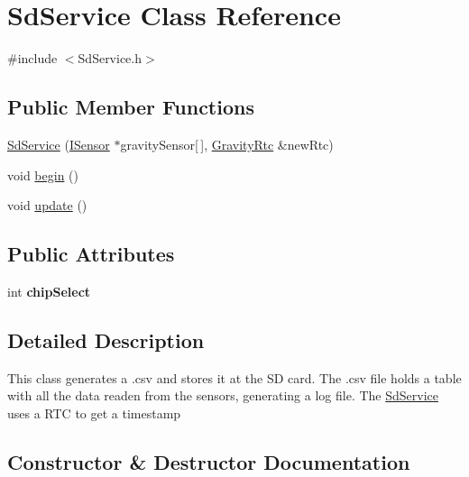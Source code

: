 \hypertarget{class_sd_service}{}\section{Sd\+Service Class Reference}
\label{class_sd_service}


{\ttfamily \#include $<$Sd\+Service.\+h$>$}

\subsection*{Public Member Functions}
\begin{DoxyCompactItemize}
\item 
\hyperlink{class_sd_service_aea88d15b3177b80996d1a6ace96fbff4}{Sd\+Service} (\hyperlink{class_i_sensor}{I\+Sensor} $\ast$gravity\+Sensor\mbox{[}$\,$\mbox{]}, \hyperlink{class_gravity_rtc}{Gravity\+Rtc} \&new\+Rtc)
\item 
void \hyperlink{class_sd_service_a5c6e09a57f22f163676a51eab6f933c5}{begin} ()
\item 
void \hyperlink{class_sd_service_a776b1a8d229b9b0bc44cbf6ae9b37c9d}{update} ()
\end{DoxyCompactItemize}
\subsection*{Public Attributes}
\begin{DoxyCompactItemize}
\item 
int {\bfseries chip\+Select}\hypertarget{class_sd_service_a173f33cc9797e3ce4e213a75e627d2c9}{}\label{class_sd_service_a173f33cc9797e3ce4e213a75e627d2c9}

\end{DoxyCompactItemize}


\subsection{Detailed Description}
This class generates a .csv and stores it at the SD card. The .csv file holds a table with all the data readen from the sensors, generating a log file. The \hyperlink{class_sd_service}{Sd\+Service} uses a R\+TC to get a timestamp 

\subsection{Constructor \& Destructor Documentation}

